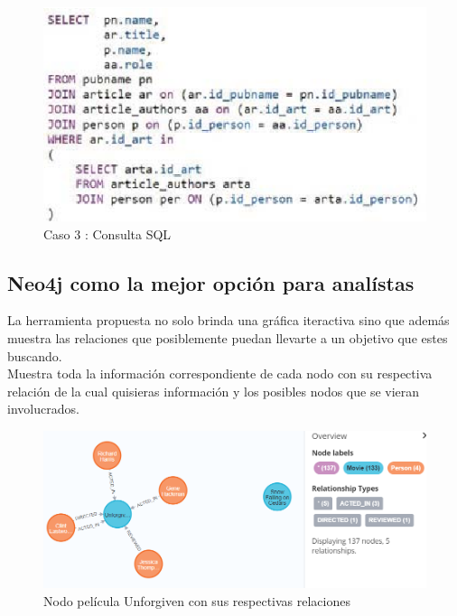 \begin{figure}[H]
    \centering
    \includegraphics[scale=0.7]{Graficos/sql2.png}
    \caption{Caso 3 : Consulta SQL}
    \label{fig:sql2}
    \end{figure}

\subsection{Neo4j como la mejor opción para analístas}
La herramienta propuesta no solo brinda una gráfica iteractiva sino que además muestra las relaciones que posiblemente puedan llevarte a un objetivo que estes buscando.\\
Muestra toda la información correspondiente de cada nodo con su respectiva relación de la cual quisieras información y los posibles nodos que se vieran involucrados.
\begin{figure}[H]
    \centering
    \includegraphics[scale=0.5]{Graficos/att.png}
    \caption{Nodo película Unforgiven con sus respectivas relaciones}
    \label{fig:att}
    \end{figure}
